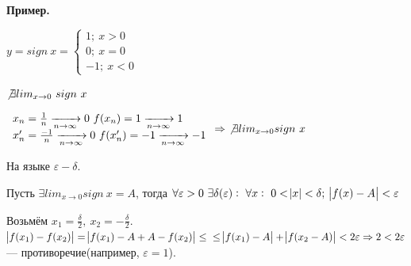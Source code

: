 \documentclass{article}
\begin{document}
  \textbf{Пример.}
  
  \(y=sign\ x=\begin{cases}1;\ x>0\\ 0;\ x=0\\ -1;\ x<0\end{cases}\)

  \(\not\exists lim_{x \rightarrow 0}\ sign\ x\)

  \(
  \begin{array}{l}
    x_n = \frac{1}{n} \xrightarrow[n \rightarrow \infty]{} 0\ f(x_n)=1 \xrightarrow[n \rightarrow \infty]{} 1\\
    x_n' = \frac{-1}{n} \xrightarrow[n \rightarrow \infty]{} 0\ f(x_n')=-1 \xrightarrow[n \rightarrow \infty]{} -1
  \end{array} \Rightarrow
  \ \not\exists lim_{x \rightarrow 0} sign\ x
  \)

  На языке \(\varepsilon - \delta.\)

  Пусть \(\exists lim_{x \rightarrow 0} sign\ x = A\), тогда \(\forall \varepsilon > 0\ \exists \delta(\varepsilon):\ \forall x:\ 0 < \abs{x} < \delta;\ \abs{f(x)-A}<\varepsilon\)

  Возьмём \(x_1 = \frac{\delta}{2},\ x_2 = -\frac{\delta}{2}\). \(\abs{f(x_1)-f(x_2)} = \abs{f(x_1)-A+A-f(x_2)} \leq\\ \leq \abs{f(x_1)-A}+\abs{f(x_2-A)} < 2 \varepsilon \Rightarrow 2 < 2\varepsilon\) --- противоречие(например, \(\varepsilon = 1\)).
\end{document}
